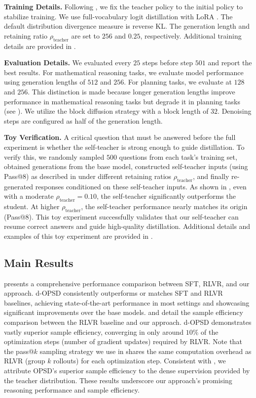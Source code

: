 \documentclass{article}
\begin{document}
\textbf{Training Details. } Following \citep{zhao2026self}, we fix the teacher policy to the initial policy to stabilize training. We use full-vocabulary logit distillation with LoRA \citep{hu2022lora}. The default distribution divergence measure is reverse KL. The generation length and retaining ratio $\rho_\text{teacher}$ are set to $256$ and $0.25$, respectively. Additional training details are provided in .

\textbf{Evaluation Details. } We evaluated every $25$ steps before step $501$ and report the best results. For mathematical reasoning tasks, we evaluate model performance using generation lengths of $512$ and $256$. For planning tasks, we evaluate at $128$ and $256$. This distinction is made because longer generation lengths improve performance in mathematical reasoning tasks but degrade it in planning tasks (see ). We utilize the block diffusion strategy \citep{arriola2025block} with a block length of $32$. Denoising steps are configured as half of the generation length. 

\textbf{Toy Verification. } A critical question that must be answered before the full experiment is whether the self-teacher is strong enough to guide distillation. To verify this, we randomly sampled $500$ questions from each task's training set, obtained generations from the base model, constructed self-teacher inputs (using Pass@$8$) as described in  under different retaining ratios $\rho_\text{teacher}$, and finally re-generated responses conditioned on these self-teacher inputs. As shown in , even with a moderate $\rho_\text{teacher} = 0.10$, the self-teacher significantly outperforms the student. At higher $\rho_\text{teacher}$, the self-teacher performance nearly matches its origin (Pass@8). This toy experiment successfully validates that our self-teacher can resume correct answers and guide high-quality distillation. Additional details and examples of this toy experiment are provided in .  

\subsection{Main Results} \label{sec4.2}


 presents a comprehensive performance comparison between SFT, RLVR, and our approach. d-OPSD consistently outperforms or matches SFT and RLVR baselines, achieving state-of-the-art performance in most settings and showcasing significant improvements over the base models.  and  detail the sample efficiency comparison between the RLVR baseline and our approach. d-OPSD demonstrates vastly superior sample efficiency, converging in only around $10\%$ of the optimization steps (number of gradient updates) required by RLVR. Note that the pass@$k$ sampling strategy we use in  shares the same computation overhead as RLVR (group $k$ rollouts) for each optimization step. Consistent with \citep{lu2025onpolicydistillation, zhao2026self}, we attribute OPSD’s superior sample efficiency to the dense supervision provided by the teacher distribution. These results underscore our approach's promising reasoning performance and sample efficiency.
\end{document}
